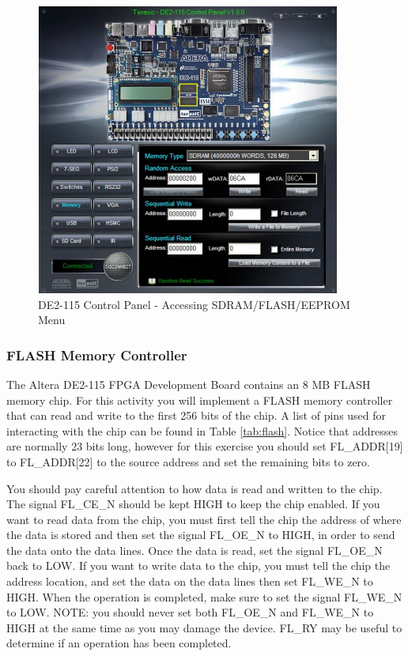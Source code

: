 \begin{figure}[H]
	\centering
	\includegraphics[width=100mm]{Lab5/figures/controlpanel.png}
	\caption{DE2-115 Control Panel - Accessing SDRAM/FLASH/EEPROM Menu}
	\label{fig:controlpanel}
\end{figure}

\subsubsection{FLASH Memory Controller}
The Altera DE2-115 FPGA Development Board contains an 8 MB FLASH memory chip. For this activity you will implement a FLASH memory controller that can read and write to the first 256 bits of the chip. A list of pins used for interacting with the chip can be found in Table \ref{tab:flash}. Notice that addresses are normally 23 bits long, however for this exercise you should set FL\_ADDR[19] to FL\_ADDR[22] to the source address and set the remaining bits to zero. 

You should pay careful attention to how data is read and written to the chip. The signal FL\_CE\_N should be kept HIGH to keep the chip enabled. If you want to read data from the chip, you must first tell the chip the address of where the data is stored and then set the signal FL\_OE\_N to HIGH,  in order to send the data onto the data lines. Once the data is read, set the signal FL\_OE\_N back to LOW. If you want to write data to the chip, you must tell the chip the address location, and set the data on the data lines then set FL\_WE\_N to HIGH. When the operation is completed, make sure to set the signal FL\_WE\_N to LOW. NOTE: you should never set both FL\_OE\_N and FL\_WE\_N to HIGH at the same time as you may damage the device. FL\_RY may be useful to determine if an operation has been completed. 

